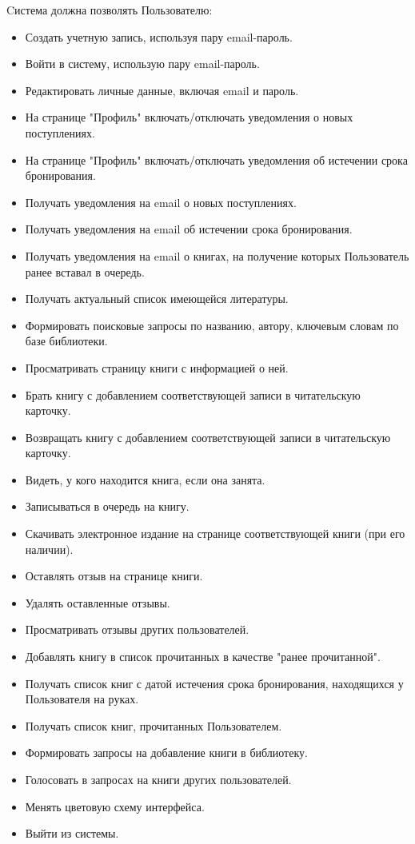 \documentclass[../doc.tex]{subfiles}
\begin{document}
\par
Cистема должна позволять Пользователю:
\begin{itemize}
    \item Создать учетную запись, используя пару email-пароль.
    \item Войти в систему, использую пару email-пароль.
    \item Редактировать личные данные, включая email и пароль.
    \item На странице "Профиль" включать/отключать уведомления о новых поступлениях.
    \item На странице "Профиль" включать/отключать уведомления об истечении срока бронирования.
    \item Получать уведомления на email о новых поступлениях.
    \item Получать уведомления на email об истечении срока бронирования.
    \item Получать уведомления на email о книгах, на получение которых Пользователь ранее вставал в очередь.
    \item Получать актуальный список имеющейся литературы.
    \item Формировать поисковые запросы по названию, автору, ключевым словам по базе библиотеки.
    \item Просматривать страницу книги с информацией о ней.
    \item Брать книгу с добавлением соответствующей записи в читательскую карточку.
    \item Возвращать книгу с добавлением соответствующей записи в читательскую карточку.
    \item Видеть, у кого находится книга, если она занята.
    \item Записываться в очередь на книгу.
    \item Скачивать электронное издание на странице соответствующей книги (при его наличии).
    \item Оставлять отзыв на странице книги.
    \item Удалять оставленные отзывы.
    \item Просматривать отзывы других пользователей.
    \item Добавлять книгу в список прочитанных в качестве "ранее прочитанной".
    \item Получать список книг с датой истечения срока бронирования, находящихся у Пользователя на руках.
    \item Получать список книг, прочитанных Пользователем. 
    \item Формировать запросы на добавление книги в библиотеку.
    \item Голосовать в запросах на книги других пользователей.
    \item Менять цветовую схему интерфейса.
    \item Выйти из системы.
\end{itemize}
\end{document}
